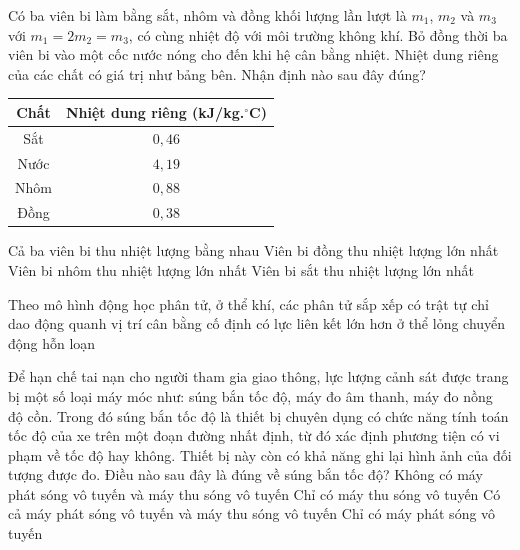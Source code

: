 	\begin{ex}%
		Có ba viên bi làm bằng sắt, nhôm và đồng khối lượng lần lượt là $m_1$, $m_2$ và $m_3$ với $m_1=2m_2=m_3$, có cùng nhiệt độ với môi trường không khí. Bỏ đồng thời ba viên bi vào một cốc nước nóng cho đến khi hệ cân bằng nhiệt. Nhiệt dung riêng của các chất có giá trị như bảng bên. Nhận định nào sau đây đúng?
		\begin{center}
			{\renewcommand{\arraystretch}{1.15}%
			\begin{tabular}{|c|c|}
				\hline
				\textbf{Chất} & \textbf{Nhiệt dung riêng (kJ/kg.$^\circ$C)}\\
				\hline
				Sắt & $0{,}46$\\
				\hline
				Nước & $4{,}19$\\
				\hline
				Nhôm & $0{,}88$\\
				\hline
				Đồng & $0{,}38$\\
				\hline
			\end{tabular}}
		\end{center}
		\choice
		{Cả ba viên bi thu nhiệt lượng bằng nhau}
		{Viên bi đồng thu nhiệt lượng lớn nhất}
		{Viên bi nhôm thu nhiệt lượng lớn nhất}
		{\True Viên bi sắt thu nhiệt lượng lớn nhất}
	\end{ex}

	\begin{ex}%
		Theo mô hình động học phân tử, ở thể khí, các phân tử
		\choice
		{sắp xếp có trật tự}
		{chỉ dao động quanh vị trí cân bằng cố định}
		{có lực liên kết lớn hơn ở thể lỏng}
		{\True chuyển động hỗn loạn}
	\end{ex}

	\begin{ex}%
		Để hạn chế tai nạn cho người tham gia giao thông, lực lượng cảnh sát được trang bị một số loại máy móc như: súng bắn tốc độ, máy đo âm thanh, máy đo nồng độ cồn. Trong đó súng bắn tốc độ là thiết bị chuyên dụng có chức năng tính toán tốc độ của xe trên một đoạn đường nhất định, từ đó xác định phương tiện có vi phạm về tốc độ hay không. Thiết bị này còn có khả năng ghi lại hình ảnh của đối tượng được đo. Điều nào sau đây là đúng về súng bắn tốc độ?
		\choice
		{Không có máy phát sóng vô tuyến và máy thu sóng vô tuyến}
		{Chỉ có máy thu sóng vô tuyến}
		{\True Có cả máy phát sóng vô tuyến và máy thu sóng vô tuyến}
		{Chỉ có máy phát sóng vô tuyến}
	\end{ex}

